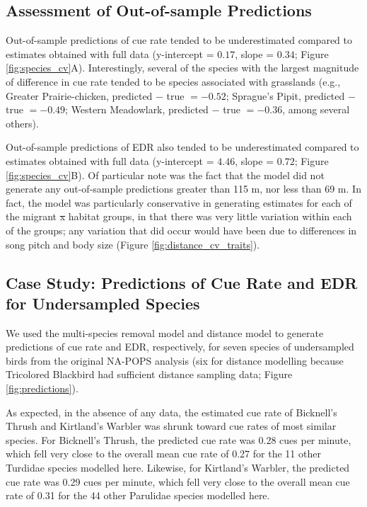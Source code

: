 \documentclass[12pt]{article}
\makeatletter
\providecommand{\DIFadd}[1]{{\protect\color{blue}\uwave{#1}}} %
\providecommand{\DIFdel}[1]{{\protect\color{red}\sout{#1}}} %
\providecommand{\DIFaddbegin}{} %
\providecommand{\DIFaddend}{} %
\providecommand{\DIFdelbegin}{} %
\providecommand{\DIFdelend}{} %
\newcommand{\DIFscaledelfig}{0.5}
\newlength{\DIFdelgraphicswidth} %
\newlength{\DIFdelgraphicsheight} %
\newcommand{\DIFaddincludegraphics}[2][]{{\color{blue}\fbox{\DIFOincludegraphics[#1]{#2}}}} %
\newcommand{\DIFdelincludegraphics}[2][]{%
\sbox{\DIFdelgraphicsbox}{\DIFOincludegraphics[#1]{#2}}%
\settoboxwidth{\DIFdelgraphicswidth}{\DIFdelgraphicsbox} %
\settoboxtotalheight{\DIFdelgraphicsheight}{\DIFdelgraphicsbox} %
\scalebox{\DIFscaledelfig}{%
\parbox[b]{\DIFdelgraphicswidth}{\usebox{\DIFdelgraphicsbox}\\[-\baselineskip] \rule{\DIFdelgraphicswidth}{0em}}\llap{\resizebox{\DIFdelgraphicswidth}{\DIFdelgraphicsheight}{%
\setlength{\unitlength}{\DIFdelgraphicswidth}%
\begin{picture}(1,1)%
\thicklines\linethickness{2pt} %
{\color[rgb]{1,0,0}\put(0,0){\framebox(1,1){}}}%
{\color[rgb]{1,0,0}\put(0,0){\line( 1,1){1}}}%
{\color[rgb]{1,0,0}\put(0,1){\line(1,-1){1}}}%
\end{picture}%
}\hspace*{3pt}}} %
} %
\DeclareRobustCommand{\DIFaddbegin}{\DIFOaddbegin \let\includegraphics\DIFaddincludegraphics} %
\DeclareRobustCommand{\DIFaddend}{\DIFOaddend \let\includegraphics\DIFOincludegraphics} %
\DeclareRobustCommand{\DIFdelbegin}{\DIFOdelbegin \let\includegraphics\DIFdelincludegraphics} %
\DeclareRobustCommand{\DIFdelend}{\DIFOaddend \let\includegraphics\DIFOincludegraphics} %
\let\sout@orig\sout %
\renewcommand{\sout}[1]{\ifmmode\text{\sout@orig{\ensuremath{#1}}}\else\sout@orig{#1}\fi} %
\makeatother
\begin{document}
\subsection{Assessment of Out-of-sample Predictions}

\par Out-of-sample predictions of cue rate tended to be underestimated compared to estimates obtained with full data (y-intercept = $0.17$, slope = $0.34$; Figure \ref{fig:species_cv}A).
Interestingly, several of the species with the largest magnitude of difference in cue rate tended to be species associated with grasslands (e.g., Greater Prairie-chicken, predicted $-$ true $= -0.52$; Sprague's Pipit, predicted $-$ true $= -0.49$; Western Meadowlark, predicted $-$ true $= -0.36$, among several others).

\par Out-of-sample predictions of EDR also tended to be underestimated compared to estimates obtained with full data (y-intercept = $4.46$, slope = $0.72$; Figure \ref{fig:species_cv}B).
Of particular note was the fact that the model did not generate any out-of-sample predictions greater than 115 m, nor less than 69 m.
In fact, the model was particularly conservative in generating estimates for each of the migrant \DIFdelbegin \DIFdel{x }\DIFdelend \DIFaddbegin \DIFadd{$\times$ }\DIFaddend habitat groups, in that there was very little variation within each of the groups; any variation that did occur would have been due to differences in song pitch and body size (Figure \ref{fig:distance_cv_traits}).

\subsection{Case Study: Predictions of Cue Rate and EDR for Undersampled Species}

\par We used the multi-species removal model and distance model to generate predictions of cue rate and EDR, respectively, for seven species of undersampled birds from the original NA-POPS analysis (six for distance modelling because Tricolored Blackbird had sufficient distance sampling data; Figure \ref{fig:predictions}).

\par As expected, in the absence of any data, the estimated cue rate of Bicknell’s Thrush and Kirtland’s Warbler was shrunk toward cue rates of most similar species.
For Bicknell's Thrush, the predicted cue rate was 0.28 cues per minute, which fell very close to the overall mean cue rate of 0.27 for the 11 other Turdidae species modelled here.
Likewise, for Kirtland's Warbler, the predicted cue rate was 0.29 cues per minute, which fell very close to the overall mean cue rate of 0.31 for the 44 other Parulidae species modelled here.
\end{document}
